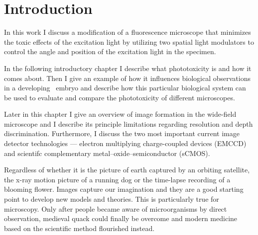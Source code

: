 \chapter{Introduction}
\label{sec:intro}
\begin{summary}
  In this work I discuss a modification of a fluorescence microscope
  that minimizes the toxic effects of the excitation light by
  utilizing two spatial light modulators to control the angle and
  position of the excitation light in the specimen.

  In the following introductory chapter I describe what phototoxicity   
  is and how it comes about. Then I give an example of how it
  influences biological observations in a developing \celegans\ 
  embryo and describe how this particular biological system can be
  used to evaluate and compare the phototoxicity of different microscopes.

  Later in this chapter I give an overview of image formation   
  in the wide-field microscope and I describe its principle limitations
  regarding resolution and depth discrimination. Furthermore, I
  discuss the two most important current image detector technologies
  --- electron multiplying charge-coupled devices (EMCCD) and
  scientifc complementary metal–oxide–semiconductor (sCMOS).
\end{summary}
Regardless of whether it is the picture of earth captured by an
orbiting satellite, the x-ray motion picture of a running dog or the
time-lapse recording of a blooming flower. Images capture our
imagination and they are a good starting point to develop new models
and theories. This is particularly true for microscopy.  Only after
people became aware of microorganisms by direct observation, medieval
quack could finally be overcome and modern medicine based on the
scientific method flourished instead.

